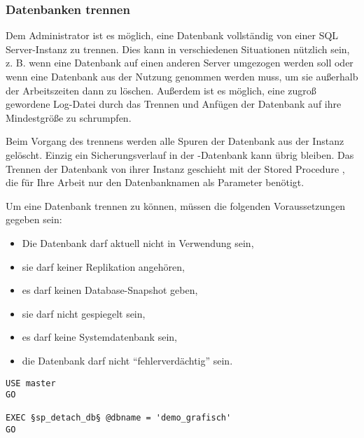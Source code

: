         \subsubsection{Datenbanken trennen}
          Dem Administrator ist es möglich, eine Datenbank vollständig von einer
          SQL Server-Instanz zu trennen. Dies kann in verschiedenen Situationen
          nützlich sein, z. B. wenn eine Datenbank auf einen anderen Server
          umgezogen werden soll oder wenn eine Datenbank aus der Nutzung genommen
          werden muss, um sie außerhalb der Arbeitszeiten dann zu löschen.
          Außerdem ist es möglich, eine zugroß gewordene Log-Datei durch das
          Trennen und Anfügen der Datenbank auf ihre Mindestgröße zu schrumpfen.
          
          Beim Vorgang des trennens werden alle Spuren der Datenbank aus der
          Instanz gelöscht. Einzig ein Sicherungsverlauf in der
          -Datenbank kann übrig bleiben. Das Trennen der
          Datenbank von ihrer Instanz geschieht mit der Stored Procedure
          , die für Ihre Arbeit nur den Datenbanknamen
          als Parameter benötigt.
          
          Um eine Datenbank trennen zu können, müssen die folgenden
          Voraussetzungen gegeben sein:
          \begin{itemize}
            \item Die Datenbank darf aktuell nicht in Verwendung sein,
            \item sie darf keiner Replikation angehören,
            \item es darf keinen Database-Snapshot geben,
            \item sie darf nicht gespiegelt sein,
            \item es darf keine Systemdatenbank sein,
            \item die Datenbank darf nicht \enquote{fehlerverdächtig} sein.
          \end{itemize}
          \begin{lstlisting}[language=ms_sql,caption={Trennen der Datenbank
          demo\_grafisch},label=admin03_20]
USE master
GO

EXEC §sp_detach_db§ @dbname = 'demo_grafisch'
GO
          \end{lstlisting}
          \begin{literaturinternet}
            \item \cite{ms188031}
          \end{literaturinternet}
